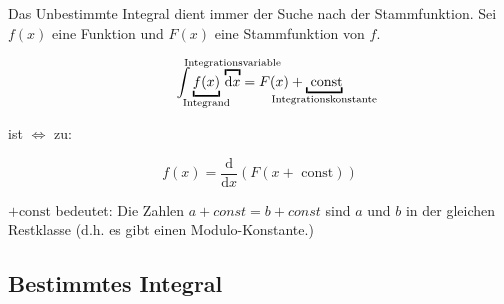 Das Unbestimmte Integral dient immer der Suche nach der Stammfunktion.
Sei $f(x)$ eine Funktion und $F(x)$ eine Stammfunktion von $f$.

 \[
 \int \underbracket{f(x)}_{\mathclap{\text{Integrand}}}\, \overbracket{\mathrm{d}x}^{\mathclap{\text{Integrationsvariable}}} = F(x) + \underbracket{\text{ const}}_{\mathclap{\text{Integrationskonstante}}}
 \]
 
 ist $\Leftrightarrow$ zu:
 
 \[
	 f(x) = \frac{\mathrm{d}}{\mathrm{d}x}(F(x + \text{ const}))
 \]


$+\text{const}$ bedeutet: Die Zahlen $a + const = b + const$ sind $a$ und $b$ in der gleichen Restklasse (d.h. es gibt einen Modulo-Konstante.)



\subsection{Bestimmtes Integral}



